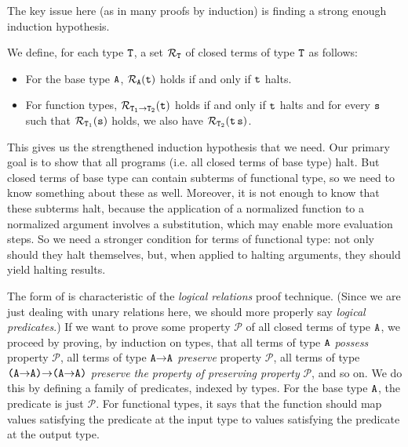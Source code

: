\documentclass[11pt,twoside=off,numbers=noenddot]{scrbook}
\begin{document}
The key issue here (as in many proofs by induction) is finding a
strong enough induction hypothesis.

\begin{definition}
  We define, for each type $\texttt{T}$, a set $\mathcal{R}_{\texttt{T}}$ of
  closed terms of type $\texttt{T}$ as follows:
  \begin{itemize}
    \item For the base type $\texttt{A}$, $\mathcal{R}_{\texttt{A}}(\texttt{t})$
      holds if and only if $\texttt{t}$ halts.
    \item For function types, $\mathcal{R}_{\texttt{T}_1 \rightarrow
      \texttt{T}_2}(\texttt{t})$ holds if and only if $\texttt{t}$ halts and
      for every $\texttt{s}$ such that
      $\mathcal{R}_{\texttt{T}_1}(\texttt{s})$ holds, we also have
      $\mathcal{R}_{\texttt{T}_2}(\texttt{t\,s})$.
  \end{itemize}
\end{definition}

This gives us the strengthened induction hypothesis that we need. Our
primary goal is to show that all programs (i.e. all closed terms of
base type) halt. But closed terms of base type can contain subterms
of functional type, so we need to know something about these as well.
Moreover, it is not enough to know that these subterms halt, because
the application of a normalized function to a normalized argument
involves a substitution, which may enable more evaluation steps. So
we need a stronger condition for terms of functional type: not only
should they halt themselves, but, when applied to halting arguments,
they should yield halting results.

The form of  is characteristic of the
\textit{logical relations} proof technique. (Since we are just
  dealing with unary relations here, we should more properly say
\textit{logical predicates}.) If we want to prove some property
$\mathcal{P}$ of all closed terms of type $\texttt{A}$, we proceed by
proving, by induction on types, that all terms of type $\texttt{A}$
\textit{possess} property $\mathcal{P}$, all terms of type
$\texttt{A$\rightarrow$A}$ \textit{preserve} property $\mathcal{P}$, all
terms of type $\texttt{(A$\rightarrow$A)$\rightarrow$(A$\rightarrow$A)}$
\textit{preserve the property of preserving property} $\mathcal{P}$,
and so on. We do this by defining a family of predicates, indexed by
types. For the base type $\texttt{A}$, the predicate is just
$\mathcal{P}$. For functional types, it says that the function should
map values satisfying the predicate at the input type to values
satisfying the predicate at the output type.
\end{document}
